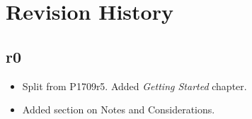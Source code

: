 \section{Revision History}

\subsection*{\paperno r0}

\begin{itemize}
      \item Split from P1709r5. Added \textit{Getting Started} chapter.
      \item Added section on Notes and Considerations.
\end{itemize}
